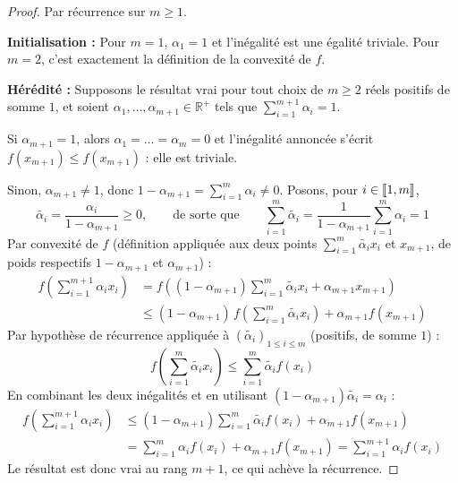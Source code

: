 \begin{proof}
Par récurrence sur $m\geq 1$.

\textbf{Initialisation :} Pour $m=1$, $\alpha_1=1$ et l'inégalité est une égalité triviale. Pour $m=2$, c'est exactement la définition de la convexité de $f$.

\textbf{Hérédité :} Supposons le résultat vrai pour tout choix de $m\geq 2$ réels positifs de somme $1$, et soient $\alpha_1,\dots,\alpha_{m+1}\in\mathbb{R}^+$ tels que $\displaystyle\sum_{i=1}^{m+1}\alpha_i=1$.

Si $\alpha_{m+1}=1$, alors $\alpha_1=\dots=\alpha_m=0$ et l'inégalité annoncée s'écrit $f(x_{m+1})\leq f(x_{m+1})$ : elle est triviale.

Sinon, $\alpha_{m+1}\neq 1$, donc $1-\alpha_{m+1}=\displaystyle\sum_{i=1}^m \alpha_i \neq 0$. Posons, pour $i\in\llbracket 1,m \rrbracket$,
\[\widetilde{\alpha_i} = \frac{\alpha_i}{1-\alpha_{m+1}} \geq 0, \qquad \text{de sorte que} \qquad \sum_{i=1}^m \widetilde{\alpha_i} = \frac{1}{1-\alpha_{m+1}}\sum_{i=1}^m \alpha_i = 1\]
Par convexité de $f$ (définition appliquée aux deux points $\displaystyle\sum_{i=1}^m \widetilde{\alpha_i}x_i$ et $x_{m+1}$, de poids respectifs $1-\alpha_{m+1}$ et $\alpha_{m+1}$) :
\begin{align*}
f\left(\sum_{i=1}^{m+1}\alpha_i x_i\right)
&= f\left((1-\alpha_{m+1})\sum_{i=1}^m \widetilde{\alpha_i} x_i + \alpha_{m+1}x_{m+1}\right) \\
&\leq (1-\alpha_{m+1})\, f\left(\sum_{i=1}^m \widetilde{\alpha_i}x_i\right) + \alpha_{m+1}f(x_{m+1})
\end{align*}
Par hypothèse de récurrence appliquée à $(\widetilde{\alpha_i})_{1\leq i\leq m}$ (positifs, de somme $1$) :
\[f\left(\sum_{i=1}^m \widetilde{\alpha_i}x_i\right) \leq \sum_{i=1}^m \widetilde{\alpha_i}f(x_i)\]
En combinant les deux inégalités et en utilisant $(1-\alpha_{m+1})\widetilde{\alpha_i}=\alpha_i$ :
\begin{align*}
f\left(\sum_{i=1}^{m+1}\alpha_i x_i\right)
&\leq (1-\alpha_{m+1})\sum_{i=1}^m \widetilde{\alpha_i}f(x_i) + \alpha_{m+1}f(x_{m+1}) \\
&= \sum_{i=1}^m \alpha_i f(x_i) + \alpha_{m+1}f(x_{m+1})
= \sum_{i=1}^{m+1}\alpha_i f(x_i)
\end{align*}
Le résultat est donc vrai au rang $m+1$, ce qui achève la récurrence.
\end{proof}
